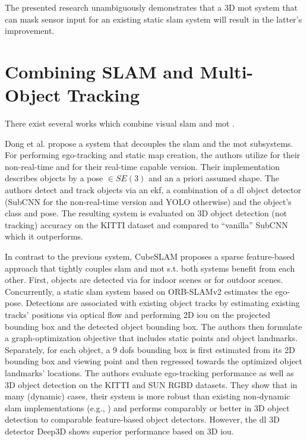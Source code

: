 \documentclass[headsepline, hidelinks, footsepline, footinclude=false, oneside, fontsize=11pt, paper=a4, listof=totoc, bibliography=totoc]{scrbook}
\begin{document}
The presented research unambiguously demonstrates that a 3D \gls{mot} system that can mask sensor input for an existing static \gls{slam} system will result in the latter's improvement.

\section{Combining SLAM and Multi-Object Tracking}
\label{sec:orgbe2e88c}
There exist several works which combine visual \gls{slam} and \gls{mot} \cite{liStereoVisionbasedSemantic2018,heneinDynamicSLAMNeed2020,barsanRobustDenseMapping2018,yangCubeSLAMMonocular3D2019,dongVisualInertialSemanticSceneRepresentation2017}.

Dong et al. \cite{dongVisualInertialSemanticSceneRepresentation2017} propose a system that decouples the \gls{slam} and the \gls{mot} subsystems.
For performing ego-tracking and static map creation, the authors utilize \cite{tsotsosRobustInferenceVisualinertial2015} for their non-real-time and \cite{mur-artalORBSLAMVersatileAccurate2015a} for their real-time capable version. 
Their implementation describes objects by a pose \(\in SE(3)\) and an a priori assumed shape. 
The authors detect and track objects via an \gls{ekf}, a combination of a \gls{dl} object detector (SubCNN \cite{xiangSubcategoryawareConvolutionalNeural2017} for the non-real-time version and YOLO \cite{redmonYouOnlyLook2016} otherwise) and the object's class and pose.
The resulting system is evaluated on 3D object detection (not tracking) accuracy on the KITTI dataset \cite{geigerVisionMeetsRobotics2013} and compared to ``vanilla'' SubCNN \cite{xiangSubcategoryawareConvolutionalNeural2017} which it outperforms. 

In contrast to the previous system, CubeSLAM \cite{yangCubeSLAMMonocular3D2019} proposes a sparse feature-based approach that tightly couples \gls{slam} and \gls{mot} s.t. both systems benefit from each other.
First, objects are detected via \cite{redmonYouOnlyLook2016} for indoor scenes or \cite{caiUnifiedMultiscaleDeep2016} for outdoor scenes.
Concurrently, a static \gls{slam} system based on ORB-SLAMv2 \cite{mur-artalORBSLAM2OpenSourceSLAM2017} estimates the ego-pose.
Detections are associated with existing object tracks by estimating existing tracks' positions via optical flow and performing 2D \gls{iou} on the projected bounding box and the detected object bounding box.
The authors then formulate a graph-optimization objective that includes static points and object landmarks. Separately, for each object, a 9 \glspl{dof} bounding box is first estimated from
its 2D bounding box and viewing point and then regressed towards the optimized object landmarks' locations. 
The authors evaluate ego-tracking performance as well as 3D object detection on the KITTI \cite{geigerVisionMeetsRobotics2013} and SUN RGBD \cite{songSUNRGBDRGBD2015} datasets. 
They show that in many (dynamic) cases, their system is more robust than existing non-dynamic \gls{slam} implementations (e.g., \cite{mur-artalORBSLAM2OpenSourceSLAM2017})
and performs comparably or better in 3D object detection to comparable feature-based object detectors. However, the \gls{dl} 3D detector Deep3D \cite{mousavian3DBoundingBox2017} shows superior performance based on 3D \gls{iou}.
\end{document}
